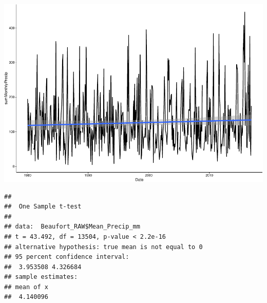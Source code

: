 \documentclass[
  12pt,
]{article}
\newenvironment{Shaded}{\begin{snugshade}}{\end{snugshade}}
\newcommand{\FunctionTok}[1]{\textcolor[rgb]{0.00,0.00,0.00}{#1}}
\newcommand{\NormalTok}[1]{#1}
\newcommand{\SpecialCharTok}[1]{\textcolor[rgb]{0.00,0.00,0.00}{#1}}
\begin{document}
\includegraphics{Project_Template_TLK_files/figure-latex/initial plots-2.pdf}

\begin{Shaded}
\end{Shaded}

\begin{verbatim}
## 
##  One Sample t-test
## 
## data:  Beaufort_RAW$Mean_Precip_mm
## t = 43.492, df = 13504, p-value < 2.2e-16
## alternative hypothesis: true mean is not equal to 0
## 95 percent confidence interval:
##  3.953508 4.326684
## sample estimates:
## mean of x 
##  4.140096
\end{verbatim}
\end{document}
